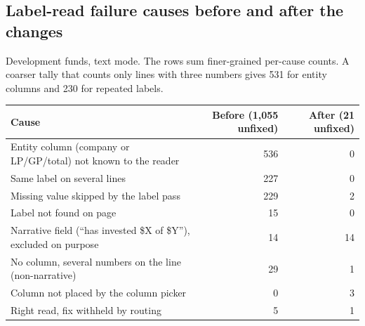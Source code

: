 \subsection{Label-read failure causes before and after the changes}\label{app:diag}
Development funds, text mode. The rows sum finer-grained per-cause counts. A coarser tally that counts only lines with three numbers gives 531 for entity columns and 230 for repeated labels.
\begin{center}
\begin{tabular}{lrr}
\toprule
Cause & Before (1,055 unfixed) & After (21 unfixed) \\
\midrule
Entity column (company or LP/GP/total) not known to the reader & 536 & 0 \\
Same label on several lines & 227 & 0 \\
Missing value skipped by the label pass & 229 & 2 \\
Label not found on page & 15 & 0 \\
Narrative field (``has invested \$X of \$Y''), excluded on purpose & 14 & 14 \\
No column, several numbers on the line (non-narrative) & 29 & 1 \\
Column not placed by the column picker & 0 & 3 \\
Right read, fix withheld by routing & 5 & 1 \\
\bottomrule
\end{tabular}
\end{center}


